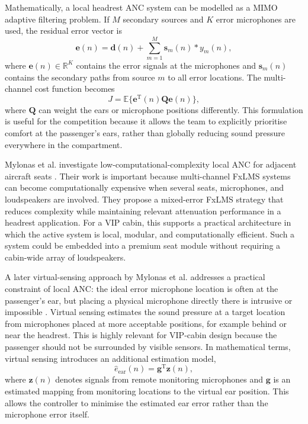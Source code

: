 Mathematically, a local headrest ANC system can be modelled as a MIMO adaptive filtering problem. If $M$ secondary sources and $K$ error microphones are used, the residual error vector is
\begin{equation}
    \mathbf{e}(n) = \mathbf{d}(n) + \sum_{m=1}^{M}\mathbf{s}_{m}(n) * y_m(n),
    \label{eq:mimo-error}
\end{equation}
where $\mathbf{e}(n)\in\mathbb{R}^{K}$ contains the error signals at the microphones and $\mathbf{s}_{m}(n)$ contains the secondary paths from source $m$ to all error locations. The multi-channel cost function becomes
\begin{equation}
    J = \mathbb{E}\{\mathbf{e}^{\mathrm{T}}(n)\mathbf{Q}\mathbf{e}(n)\},
    \label{eq:mimo-cost}
\end{equation}
where $\mathbf{Q}$ can weight the ears or microphone positions differently. This formulation is useful for the competition because it allows the team to explicitly prioritise comfort at the passenger's ears, rather than globally reducing sound pressure everywhere in the compartment.

Mylonas et al. investigate low-computational-complexity local ANC for adjacent aircraft seats \cite{mylonas2023low}. Their work is important because multi-channel FxLMS systems can become computationally expensive when several seats, microphones, and loudspeakers are involved. They propose a mixed-error FxLMS strategy that reduces complexity while maintaining relevant attenuation performance in a headrest application. For a VIP cabin, this supports a practical architecture in which the active system is local, modular, and computationally efficient. Such a system could be embedded into a premium seat module without requiring a cabin-wide array of loudspeakers.

A later virtual-sensing approach by Mylonas et al. addresses a practical constraint of local ANC: the ideal error microphone location is often at the passenger's ear, but placing a physical microphone directly there is intrusive or impossible \cite{mylonas2024virtual}. Virtual sensing estimates the sound pressure at a target location from microphones placed at more acceptable positions, for example behind or near the headrest. This is highly relevant for VIP-cabin design because the passenger should not be surrounded by visible sensors. In mathematical terms, virtual sensing introduces an additional estimation model,
\begin{equation}
    \hat{e}_{\mathrm{ear}}(n)=\mathbf{g}^{\mathrm{T}}\mathbf{z}(n),
    \label{eq:virtual-sensing}
\end{equation}
where $\mathbf{z}(n)$ denotes signals from remote monitoring microphones and $\mathbf{g}$ is an estimated mapping from monitoring locations to the virtual ear position. This allows the controller to minimise the estimated ear error rather than the microphone error itself.

